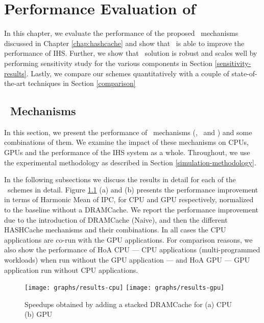 \chapter{Performance Evaluation of \cachename} \label{chap:results}
In this chapter, we evaluate the performance of the proposed \cachename\ mechanisms discussed in Chapter \ref{chap:hashcache} and show that \cachename\ is able to improve the performance of IHS. Further, we show that \cachename\ solution is robust and scales well by performing sensitivity study for the various components in Section \ref{sensitivity-results}. Lastly, we compare our schemes quantitatively with a couple of state-of-the-art techniques in Section \ref{comparison}

\section{\cachename\ Mechanisms}
In this section, we present the performance of \cachename\ mechanisms (\prioname, \bypassname\ and \chaining) and some combinations of them. We examine the impact of these mechanisms on CPUs, GPUs and the performance of the IHS system as a whole. Throughout, we use the experimental methodology as described in Section \ref{simulation-methodology}. 
\par In the following subsections we discuss the results in detail for each of the \cachename\ schemes in detail. Figure \ref{results-speedup} (a) and (b) presents the performance improvement in terms of Harmonic Mean of IPC, for CPU and GPU respectively, normalized to the baseline without a DRAMCache. We report the performance improvement due to the introduction of DRAMCache (Naive),  and then the different HASHCache mechanisms  and their combinations. In all cases the CPU applications are co-run with the GPU applications. For comparison reasons, we also show the performance of HoA CPU --- CPU applications (multi-programmed workloads) when run without the GPU application --- and  HoA GPU --- GPU application run without CPU applications.

\begin{figure}[htb]
	\centering
	\texttt{[image: graphs/results-cpu]}
	\texttt{[image: graphs/results-gpu]}
	\caption{Speedups obtained by adding a stacked DRAMCache for (a) CPU (b) GPU}
	\label{results-speedup}
\end{figure}

